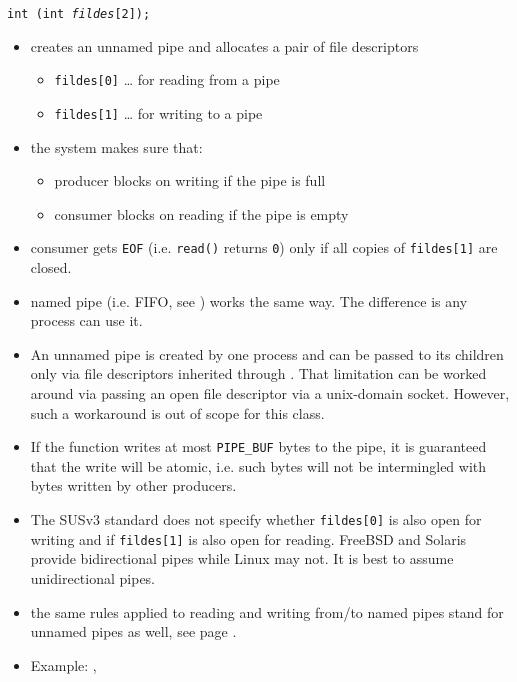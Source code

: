 \begin{slide}
\texttt{int (int \emph{fildes}[2]);}
\begin{itemize}
\item creates an unnamed pipe and allocates a pair of file descriptors
    \begin{itemize}
    \item \texttt{fildes[0]} \dots{} for reading from a pipe
    \item \texttt{fildes[1]} \dots{} for writing to a pipe
    \end{itemize}
\item the system makes sure that:
    \begin{itemize}
    \item producer blocks on writing if the pipe is full
    \item consumer blocks on reading if the pipe is empty
    \end{itemize}
\item consumer gets \texttt{EOF} (i.e. \texttt{read()} returns
\texttt{0}) only if all copies of \texttt{fildes[1]} are closed.
\item named pipe (i.e. FIFO, see ) works the same way.  The
difference is any process can use it.
\end{itemize}
\end{slide}

\label{PIPE}

\begin{itemize}
\item An unnamed pipe is created by one process and can be passed to its
children only via file descriptors inherited through .  That
limitation can be worked around via passing an open file descriptor via a
u{}nix-domain socket.  However, such a workaround is out of scope for this
class.
\item If the function  writes at most \texttt{PIPE\_BUF} bytes to
the pipe, it is guaranteed that the write will be atomic, i.e. such bytes will
not be intermingled with bytes written by other producers.
\item \label{TWO_WAY_PIPES} The SUSv3 standard does not specify whether
\texttt{fildes[0]} is also open for writing and if \texttt{fildes[1]} is also
open for reading.  FreeBSD and Solaris provide bidirectional pipes while Linux
may not.  It is best to assume unidirectional pipes.
\item {} the same rules applied to reading and writing from/to
named pipes stand for unnamed pipes as well, see page \pageref{NAMEDPIPE}.
\item Example: , 
\end{itemize}

